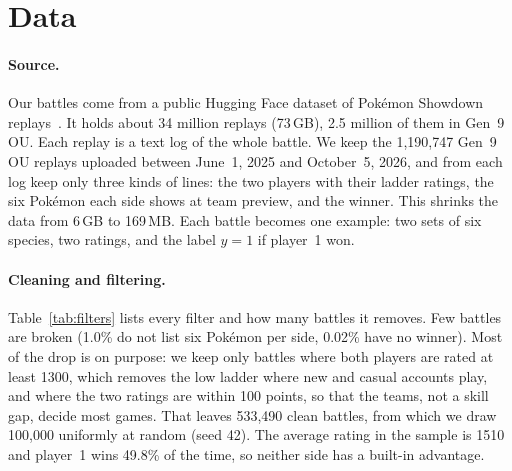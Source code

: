 
\section{Data}
\label{sec:data}

\paragraph{Source.}
Our battles come from a public Hugging Face dataset of Pok\'emon Showdown
replays~\cite{holidayougi_replays,showdown}. It holds about 34 million replays
(73\,GB), 2.5 million of them in Gen~9 OU. Each replay is a text log of the whole
battle. We keep the 1{,}190{,}747 Gen~9 OU replays uploaded between June~1, 2025
and October~5, 2026, and from each log keep only three kinds of lines: the two
players with their ladder ratings, the six Pok\'emon each side shows at team
preview, and the winner. This shrinks the data from 6\,GB to 169\,MB. Each battle
becomes one example: two sets of six species, two ratings, and the label
$y = 1$ if player~1 won.

\paragraph{Cleaning and filtering.}
Table~\ref{tab:filters} lists every filter and how many battles it removes. Few
battles are broken (1.0\% do not list six Pok\'emon per side, 0.02\% have no
winner). Most of the drop is on purpose: we keep only battles where both players
are rated at least 1300, which removes the low ladder where new and casual
accounts play, and where the two ratings are within 100 points, so that the
teams, not a skill gap, decide most games. That leaves 533{,}490 clean battles,
from which we draw 100{,}000 uniformly at random (seed 42). The average rating in
the sample is 1510 and player~1 wins 49.8\% of the time, so neither side has a
built-in advantage.

\begin{table}[t]
  \centering
  \small
  
  \caption{Filters applied to the Gen~9 OU replays, in order. The rating filter
  removes the most battles by design.}
  \label{tab:filters}
\end{table}

